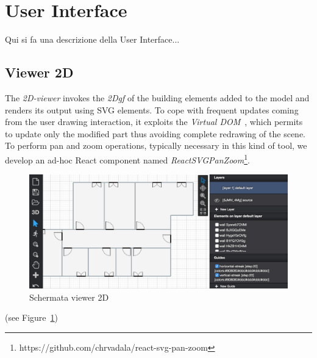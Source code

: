 \section{User Interface}
\label{sec:chapter_2_section_4}

Qui si fa una descrizione della User Interface...

\subsection{Viewer 2D}
The \emph{2D-viewer} invokes the \emph{2Dgf} of the building elements added to the model and renders its output using SVG elements. To cope with frequent updates coming from the user drawing interaction, it exploits the \emph{Virtual DOM}~\cite{vdom}, which permits to update only the modified part thus avoiding complete redrawing of the scene. To perform pan and zoom operations, typically necessary in this kind of tool, we develop an ad-hoc React component named \emph{ReactSVGPanZoom}\footnote{https://github.com/chrvadala/react-svg-pan-zoom}.
\begin{figure}[htbp] %
   \centering
   \includegraphics[width=1\linewidth]{images/2d}
   \caption{Schermata viewer 2D}
   \label{fig:view2D}
\end{figure}
   (see Figure~\ref{fig:view2D})
   \newpage


